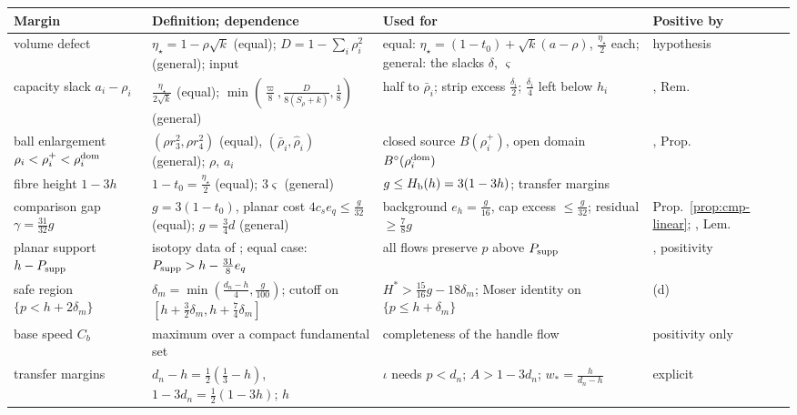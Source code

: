 \begin{table}[ht]
\centering\footnotesize
\renewcommand{\arraystretch}{1.15}
\begin{tabular}{@{}L{0.2\textwidth}L{0.29\textwidth}L{0.27\textwidth}L{0.17\textwidth}@{}}
\toprule
Margin & Definition; dependence & Used for & Positive by\\
\midrule
volume defect & $\eta_\star=1-\rho\sqrt k$ (equal); $D=1-\sum_i\rho_i^2$ (general); input & equal: $\eta_\star=(1-t_0)+\sqrt k(a-\rho)$, $\frac{\eta_\star}2$ each; general: the slacks $\delta$, $\varsigma$ & hypothesis\\
capacity slack $a_i-\rho_i$ & $\frac{\eta_\star}{2\sqrt k}$ (equal); $\min(\frac{\varpi}8,\frac D{8(S_\rho+k)},\frac18)$ (general) & half to $\bar\rho_i$; strip excess $\frac{\delta_i}2$; $\frac{\delta_i}4$ left below $h_i$ & , Rem.~\\
ball enlargement $\rho_i<\rho_i^+<\rho_i^{\rm dom}$ & $(\rho r_3^2,\rho r_4^2)$ (equal), $(\bar\rho_i,\hat\rho_i)$ (general); $\rho$, $a_i$ & closed source $B(\rho_i^+)$, open domain $B^{\circ}(\rho_i^{\rm dom})$ & , Prop.~\\
fibre height $1-3h$ & $1-t_0=\frac{\eta_\star}2$ (equal); $3\varsigma$ (general) & $g\le H_{\mathrm b}(h)=3(1-3h)$; transfer margins & \\
comparison gap $\gamma=\frac{31}{32}g$ & $g=3(1-t_0)$, planar cost $4c_se_q\le\frac g{32}$ (equal); $g=\frac34d$ (general) & background $e_h=\frac g{16}$, cap excess $\le\frac g{32}$; residual $\ge\frac78g$ & Prop.~\ref{prop:cmp-linear}; , Lem.~\\
planar support $h-P_{\rm supp}$ & isotopy data of ; equal case: $P_{\rm supp}>h-\frac{31}8e_q$ & all flows preserve $p$ above $P_{\rm supp}$ & , positivity\\
safe region $\{p<h+2\delta_m\}$ & $\delta_m=\min(\frac{d_n-h}4,\frac g{100})$; cutoff on $[h+\frac32\delta_m,h+\frac74\delta_m]$ & $H^*>\frac{15}{16}g-18\delta_m$; Moser identity on $\{p\le h+\delta_m\}$ & (d)\\
base speed $C_b$ & maximum over a compact fundamental set & completeness of the handle flow & positivity only\\
transfer margins & $d_n-h=\frac12(\frac13-h)$, $1-3d_n=\frac12(1-3h)$; $h$ & $\iota$ needs $p<d_n$; $A>1-3d_n$; $w_*=\frac h{d_n-h}$ & explicit\\

\end{tabular}
\end{table}
